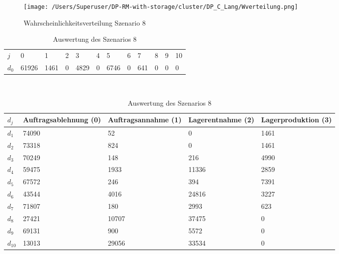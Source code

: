 \begin{figure}[h!]
  \begin{center}
    \texttt{[image: /Users/Superuser/DP-RM-with-storage/cluster/DP\_C\_Lang/Wverteilung.png]}
    \caption{Wahrscheinlichkeitsverteilung Szenario 8}  \label{SB8}
  \end{center}
\end{figure}

\begin{table}[h!]
\renewcommand{\arraystretch}{1.5}
  \begin{center}
    \caption{Auswertung des Szenarios 8}  \label{AS8}
    \vspace*{3mm}
    \begin{tabular}{l l l l l l l l l l l l }  \hline 
         $j$ & 0 & 1  & 2 & 3 & 4  & 5 & 6 & 7 & 8 & 9 & 10  \\  
$d_{0}$ &  61926 &  1461 &  0 &  4829 &  0 &  6746 &  0 &  641 &  0 &  0 &  0 \\\hline
    \end{tabular} \\[3mm]
        \begin{tabular}{ l p{2.5cm} p{2.5cm} p{2.5cm} p{2.5cm} }   \hline    %
    $d_j$ & Auftrags\-ablehnung (0) & Auftrags\-annahme (1)  & Lager\-entnahme (2) & Lager\-produktion (3)\\\hline 
$d_{1}$  &  74090 &     52 &    0 &  1461 \\
$d_{2}$  &  73318 &    824 &    0 &  1461 \\
$d_{3}$  &  70249 &    148 &    216 &  4990 \\
$d_{4}$  &  59475 &   1933 &  11336 &  2859 \\
$d_{5}$  &  67572 &    246 &    394 &  7391 \\
$d_{6}$  &  43544 &   4016 &  24816 &  3227 \\
$d_{7}$  &  71807 &    180 &   2993 &   623 \\
$d_{8}$  &  27421 &  10707 &  37475 &   0 \\
$d_{9}$  &  69131 &    900 &   5572 &   0 \\
$d_{10}$ &  13013 &  29056 &  33534 &   0 \\
          \hline
   \end{tabular} \\[3mm]
     \end{center}
\end{table}


